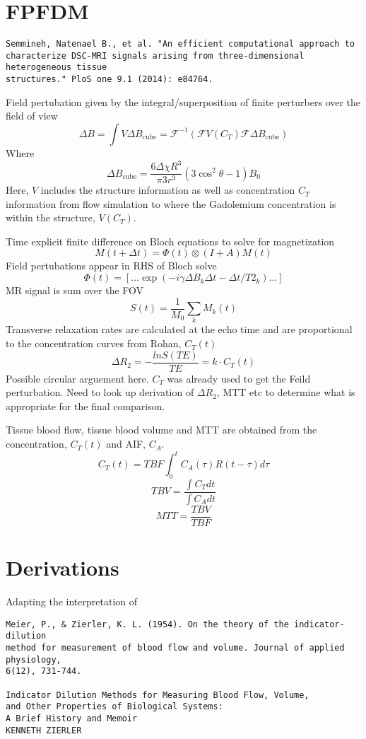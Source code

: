 \documentclass[12pt]{article}
\begin{document}
\section{FPFDM}

\begin{verbatim}
Semmineh, Natenael B., et al. "An efficient computational approach to
characterize DSC-MRI signals arising from three-dimensional heterogeneous tissue
structures." PloS one 9.1 (2014): e84764.
\end{verbatim}

Field pertubation given by the integral/superposition of finite perturbers over
the field of view
\[
\Delta B =  \int V \Delta B_\text{cube}  = \mathcal{F}^{-1} \left( \mathcal{F} V(C_T) \mathcal{F} \Delta B_\text{cube} \right)
\]
Where
\[
\Delta B_\text{cube}  = \frac{ 6 \Delta \chi R^3} {\pi 3 r^3} (3 \cos^2 \theta-1) B_0
\]
Here, $V$ includes the  structure information as well as concentration $C_T$
information from flow simulation to
where the Gadolemium concentration is within the structure, $V(C_T)$.

Time explicit finite difference on Bloch equations to solve for magnetization
\[
M(t+\Delta t) = \Phi(t) \otimes (I+A)M(t)
\]
Field pertubations appear in RHS of Bloch solve
\[
\Phi(t) = [ \dots \exp(-i \gamma \Delta B_k \Delta t - \Delta t / T2_k) \dots ] 
\]
MR signal is sum over the FOV
\[
S(t) = \frac{1}{M_0} \sum_k M_k(t)
\]
Transverse relaxation rates are calculated at the echo time and are proportional
to the concentration curves from Rohan, $C_T(t)$
\[
\Delta R_2 = - \frac{ ln S(TE)}{TE} = k \cdot C_T(t)
\]
{\color{red} Possible circular arguement here. $C_T$ was already used to get the
Feild perturbation. Need to look up derivation of $\Delta R_2$, MTT etc to
determine what is appropriate for the final comparison.}

Tissue blood flow, tissue blood volume and MTT are obtained from the
concentration, $C_T(t)$ and AIF, $C_A$.
\[
C_T(t) = TBF \int_0^t C_A(\tau) R (t-\tau) d\tau
\]
\[
TBV = \frac{ \int C_T dt}{\int C_A dt}
\]
\[
MTT = \frac{TBV}{TBF}
\]


\pagebreak
\section{Derivations}
Adapting  the interpretation of 

\begin{verbatim}
Meier, P., & Zierler, K. L. (1954). On the theory of the indicator-dilution
method for measurement of blood flow and volume. Journal of applied physiology,
6(12), 731-744.

Indicator Dilution Methods for Measuring Blood Flow, Volume,
and Other Properties of Biological Systems:
A Brief History and Memoir
KENNETH ZIERLER
\end{verbatim}
\end{document}
